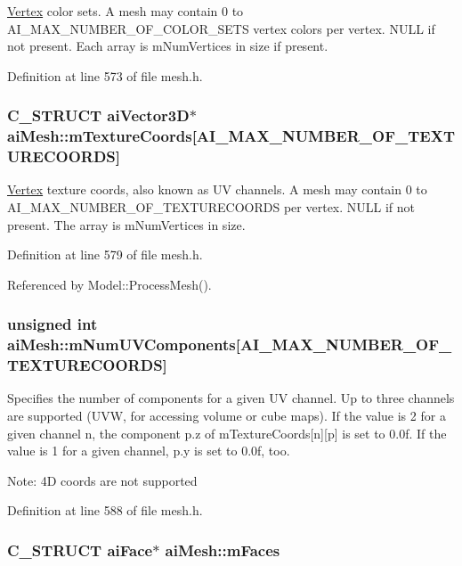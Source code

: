 \hyperlink{class_vertex}{Vertex} color sets. A mesh may contain 0 to AI\_\-MAX\_\-NUMBER\_\-OF\_\-COLOR\_\-SETS vertex colors per vertex. NULL if not present. Each array is mNumVertices in size if present. 

Definition at line 573 of file mesh.h.\hypertarget{structai_mesh_4a50b11d00ef50f419c75cab0f6bddd6}{
\subsubsection[mTextureCoords]{\setlength{\rightskip}{0pt plus 5cm}C\_\-STRUCT aiVector3D$\ast$ {\bf aiMesh::mTextureCoords}\mbox{[}AI\_\-MAX\_\-NUMBER\_\-OF\_\-TEXTURECOORDS\mbox{]}}}
\label{structai_mesh_4a50b11d00ef50f419c75cab0f6bddd6}


\hyperlink{class_vertex}{Vertex} texture coords, also known as UV channels. A mesh may contain 0 to AI\_\-MAX\_\-NUMBER\_\-OF\_\-TEXTURECOORDS per vertex. NULL if not present. The array is mNumVertices in size. 

Definition at line 579 of file mesh.h.

Referenced by Model::ProcessMesh().\hypertarget{structai_mesh_635c631a6e66d32989d6b25b2a892d86}{
\subsubsection[mNumUVComponents]{\setlength{\rightskip}{0pt plus 5cm}unsigned int {\bf aiMesh::mNumUVComponents}\mbox{[}AI\_\-MAX\_\-NUMBER\_\-OF\_\-TEXTURECOORDS\mbox{]}}}
\label{structai_mesh_635c631a6e66d32989d6b25b2a892d86}


Specifies the number of components for a given UV channel. Up to three channels are supported (UVW, for accessing volume or cube maps). If the value is 2 for a given channel n, the component p.z of mTextureCoords\mbox{[}n\mbox{]}\mbox{[}p\mbox{]} is set to 0.0f. If the value is 1 for a given channel, p.y is set to 0.0f, too. \begin{Desc}
\item[Note:]4D coords are not supported \end{Desc}


Definition at line 588 of file mesh.h.\hypertarget{structai_mesh_5a65fbc7fdea7f8d36f39047425ece07}{
\subsubsection[mFaces]{\setlength{\rightskip}{0pt plus 5cm}C\_\-STRUCT {\bf aiFace}$\ast$ {\bf aiMesh::mFaces}}}
\label{structai_mesh_5a65fbc7fdea7f8d36f39047425ece07}



